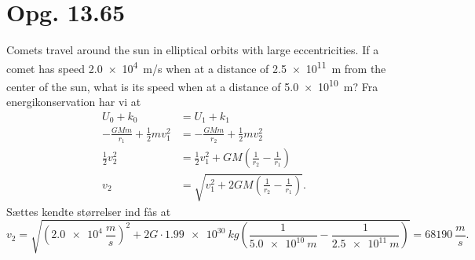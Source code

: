 \documentclass[12pt]{article}
\theoremstyle{definition}
\begin{document}
\section*{Opg. 13.65}
Comets travel around the sun in elliptical orbits with large eccentricities. If a comet has speed \qty{2,0e4}{m/s} when at a distance of \qty{2,5e11}{m} from the center of the sun, what is its speed when at a distance of \qty{5,0e10}{m}?
\bigbreak
Fra energikonservation har vi at
\begin{align*}
  U_0 + k_0 &= U_1 + k_1 \\
  - \frac{GMm}{r_1} + \frac{1}{2}m v_1^2 &= - \frac{GMm}{r_2} + \frac{1}{2} m v_2^2 \\
  \frac{1}{2}v_2^2 &= \frac{1}{2} v_1^2 + GM \left( \frac{1}{r_2} - \frac{1}{r_1} \right) \\
  v_2 &= \sqrt{v_1^2 + 2 GM \left( \frac{1}{r_2} - \frac{1}{r_1} \right)}
.\end{align*}
Sættes kendte størrelser ind fås at
\[ 
v_2 = \sqrt{\left( \qty{2,0e4}{\frac{m}{s}} \right)^2 + 2G \cdot \qty{1,99e30}{kg} \left( \frac{1}{\qty{5,0e10}{m}} - \frac{1}{\qty{2,5e11}{m}} \right) } = \qty{68190}{\frac{m}{s}} 
.\]
\end{document}
